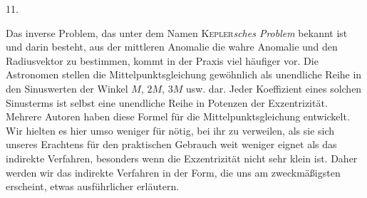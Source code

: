 \par{}
\begin{center}
11.
\end{center}
Das inverse Problem, das unter dem Namen \textsc{Kepler}\emph{sches Problem} bekannt ist und darin besteht, aus der mittleren Anomalie die wahre Anomalie und den Radiusvektor zu bestimmen, kommt in der Praxis viel häufiger vor. Die Astronomen stellen die Mittelpunktsgleichung gewöhnlich als unendliche Reihe in den Sinuswerten der Winkel $M$, $2M$, $3M$ usw. dar. Jeder Koeffizient eines solchen Sinusterms ist selbst eine unendliche Reihe in Potenzen der Exzentrizität. Mehrere Autoren haben diese Formel für die Mittelpunktsgleichung entwickelt. Wir hielten es hier umso weniger für nötig, bei ihr zu verweilen, als sie sich unseres Erachtens für den praktischen Gebrauch weit weniger eignet als das indirekte Verfahren, besonders wenn die Exzentrizität nicht sehr klein ist. Daher werden wir das indirekte Verfahren in der Form, die uns am zweckmäßigsten erscheint, etwas ausführlicher erläutern.

